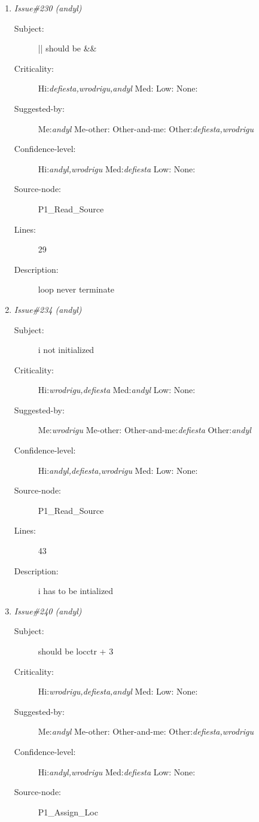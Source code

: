 \begin{enumerate}
\begin{description}
\item [Lines:] 27

\item [Description:] errorsflag has to be written to when errorsfound
\end{description}
\item {\it Issue\#230 (andyl)}
\begin{description}
\item [Subject:] || should be \&\&
\item [Criticality:] Hi:{\it defiesta,wrodrigu,andyl} Med:{\it } Low:{\it } None:{\it }
\item [Suggested-by:] Me:{\it andyl} Me-other:{\it } Other-and-me:{\it } Other:{\it defiesta,wrodrigu}
\item [Confidence-level:] Hi:{\it andyl,wrodrigu} Med:{\it defiesta} Low:{\it } None:{\it }
\item [Source-node:] P1\_Read\_Source

\item [Lines:] 29

\item [Description:] loop never terminate
\end{description}
\item {\it Issue\#234 (andyl)}
\begin{description}
\item [Subject:] i not initialized
\item [Criticality:] Hi:{\it wrodrigu,defiesta} Med:{\it andyl} Low:{\it } None:{\it }
\item [Suggested-by:] Me:{\it wrodrigu} Me-other:{\it } Other-and-me:{\it defiesta} Other:{\it andyl}
\item [Confidence-level:] Hi:{\it andyl,defiesta,wrodrigu} Med:{\it } Low:{\it } None:{\it }
\item [Source-node:] P1\_Read\_Source

\item [Lines:] 43

\item [Description:] i has to be intialized
\end{description}
\item {\it Issue\#240 (andyl)}
\begin{description}
\item [Subject:] should be locctr + 3
\item [Criticality:] Hi:{\it wrodrigu,defiesta,andyl} Med:{\it } Low:{\it } None:{\it }
\item [Suggested-by:] Me:{\it andyl} Me-other:{\it } Other-and-me:{\it } Other:{\it defiesta,wrodrigu}
\item [Confidence-level:] Hi:{\it andyl,wrodrigu} Med:{\it defiesta} Low:{\it } None:{\it }
\item [Source-node:] P1\_Assign\_Loc


\end{description}
\end{enumerate}
